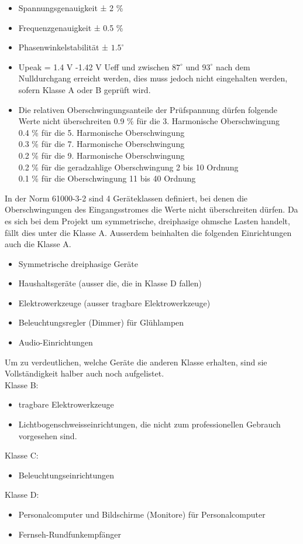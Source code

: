 \begin{itemize}
\item Spannungsgenauigkeit ± 2 \%
\item Frequenzgenauigkeit ± 0.5 \%
\item Phasenwinkelstabilität ± $1.5^\circ$
\item 	Upeak = 1.4 V -1.42 V Ueff und zwischen $87^\circ$ und $93^\circ$ nach dem Nulldurchgang erreicht werden, dies muss jedoch nicht eingehalten werden, sofern Klasse A oder B geprüft wird.
\item Die relativen Oberschwingungsanteile der Prüfspannung dürfen folgende Werte nicht überschreiten
0.9 \% für die 3. Harmonische Oberschwingung\\
0.4 \% für die 5. Harmonische Oberschwingung\\
0.3 \% für die 7. Harmonische Oberschwingung\\
0.2 \% für die 9. Harmonische Oberschwingung\\
0.2 \% für die geradzahlige Oberschwingung 2 bis 10 Ordnung\\
0.1 \% für die Oberschwingung 11 bis 40 Ordnung\\
\end{itemize} 

In der Norm 61000-3-2 sind 4 Geräteklassen definiert, bei denen die Oberschwingungen des Eingangsstromes die Werte nicht überschreiten dürfen. Da es sich bei dem Projekt um symmetrische, dreiphasige ohmsche Lasten handelt, fällt dies unter die Klasse A. Ausserdem beinhalten die folgenden Einrichtungen auch die Klasse A. 
\begin{itemize}
\item Symmetrische dreiphasige Geräte	
\item Haushaltsgeräte (ausser die, die in Klasse D fallen)
\item Elektrowerkzeuge (ausser tragbare Elektrowerkzeuge)
\item Beleuchtungsregler (Dimmer) für Glühlampen
\item Audio-Einrichtungen
\end{itemize} 

Um zu verdeutlichen, welche Geräte die anderen Klasse erhalten, sind sie Vollständigkeit halber auch noch aufgelistet.\\
Klasse B:
\begin{itemize}
	\item tragbare Elektrowerkzeuge 	
	\item Lichtbogenschweisseinrichtungen, die nicht zum professionellen Gebrauch vorgesehen sind.
\end{itemize} 
Klasse C:
\begin{itemize}
	\item Beleuchtungseinrichtungen	
\end{itemize} 
Klasse D:
\begin{itemize}
	\item Personalcomputer und Bildschirme (Monitore) für Personalcomputer	
	\item Fernseh-Rundfunkempfänger
\end{itemize}

